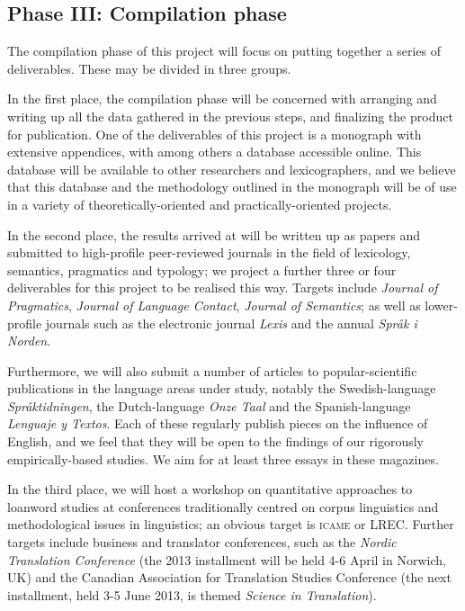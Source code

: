 \documentclass[a4paper]{article}
\begin{document}

\subsection{Phase III: Compilation phase}

The compilation phase of this project will focus on putting together a series of deliverables. These may be divided in three groups.

In the first place, the compilation phase will be concerned with arranging and writing up all the data gathered in the previous steps, and finalizing the product for publication. One of the deliverables of this project is a monograph with extensive appendices, with among others a database accessible online. This database will be available to other researchers and lexicographers, and we believe that this database and the methodology outlined in the monograph will be of use in a variety of theoretically-oriented and practically-oriented projects.

In the second place, the results arrived at will be written up as papers and submitted to high-profile peer-reviewed journals in the field of lexicology, semantics, pragmatics and typology; we project a further three or four deliverables for this project to be realised this way. Targets include \emph{Journal of Pragmatics}, \emph{Journal of Language Contact}, \emph{Journal of Semantics}; as well as lower-profile journals such as the electronic journal \emph{Lexis} and the annual \emph{Spr\aa k i Norden}.

Furthermore, we will also submit a number of articles to popular-scientific publications in the language areas under study, notably the Swedish-language \emph{Spr\aa ktidningen}, the Dutch-language \emph{Onze Taal} and the Spanish-language \\ \emph{Lenguaje y Textos}. Each of these regularly publish pieces on the influence of English, and we feel that they will be open to the findings of our rigorously empirically-based studies. We aim for at least three essays in these magazines.

In the third place, we will host a workshop on quantitative approaches to loanword studies at conferences traditionally centred on corpus linguistics and methodological issues in linguistics; an obvious target is \textsc{icame} or LREC. Further targets include business and translator conferences, such as the \emph{Nordic Translation Conference} (the 2013 installment will be held 4-6 April in Norwich, UK) and the Canadian Association for Translation Studies Conference (the next installment, held 3-5 June 2013, is themed \emph{Science in Translation}). 
\end{document}
